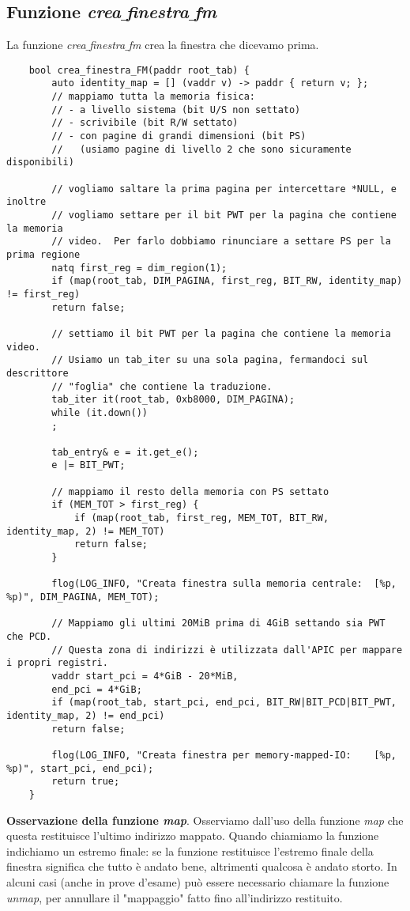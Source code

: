 \subsection{Funzione \emph{crea$\_$finestra$\_$fm}}
La funzione \emph{crea$\_$finestra$\_$fm} crea la finestra che dicevamo prima. 
\small 
\begin{verbatim}
	bool crea_finestra_FM(paddr root_tab) {
		auto identity_map = [] (vaddr v) -> paddr { return v; };
		// mappiamo tutta la memoria fisica:
		// - a livello sistema (bit U/S non settato)
		// - scrivibile (bit R/W settato)
		// - con pagine di grandi dimensioni (bit PS)
		//   (usiamo pagine di livello 2 che sono sicuramente disponibili)
		
		// vogliamo saltare la prima pagina per intercettare *NULL, e inoltre
		// vogliamo settare per il bit PWT per la pagina che contiene la memoria
		// video.  Per farlo dobbiamo rinunciare a settare PS per la prima regione
		natq first_reg = dim_region(1);
		if (map(root_tab, DIM_PAGINA, first_reg, BIT_RW, identity_map) != first_reg)
		return false;
		
		// settiamo il bit PWT per la pagina che contiene la memoria video.
		// Usiamo un tab_iter su una sola pagina, fermandoci sul descrittore
		// "foglia" che contiene la traduzione.
		tab_iter it(root_tab, 0xb8000, DIM_PAGINA);
		while (it.down())
		;
		
		tab_entry& e = it.get_e();
		e |= BIT_PWT;
		
		// mappiamo il resto della memoria con PS settato
		if (MEM_TOT > first_reg) {
			if (map(root_tab, first_reg, MEM_TOT, BIT_RW, identity_map, 2) != MEM_TOT)
			return false;
		}
		
		flog(LOG_INFO, "Creata finestra sulla memoria centrale:  [%p, %p)", DIM_PAGINA, MEM_TOT);
		
		// Mappiamo gli ultimi 20MiB prima di 4GiB settando sia PWT che PCD.
		// Questa zona di indirizzi è utilizzata dall'APIC per mappare i propri registri.
		vaddr start_pci = 4*GiB - 20*MiB,
		end_pci = 4*GiB;
		if (map(root_tab, start_pci, end_pci, BIT_RW|BIT_PCD|BIT_PWT, identity_map, 2) != end_pci)
		return false;
		
		flog(LOG_INFO, "Creata finestra per memory-mapped-IO:    [%p, %p)", start_pci, end_pci);
		return true;
	}
\end{verbatim}
\normalsize 
\begin{framed}
	\noindent \textbf{Osservazione della funzione \emph{map}}. Osserviamo dall'uso della funzione \emph{map} che questa restituisce l'ultimo indirizzo mappato. Quando chiamiamo la funzione indichiamo un estremo finale: se la funzione restituisce l'estremo finale della finestra significa che tutto è andato bene, altrimenti qualcosa è andato storto. In alcuni casi (anche in prove d'esame) può essere necessario chiamare la funzione \emph{unmap}, per annullare il "mappaggio" fatto fino all'indirizzo restituito.
\end{framed} 
